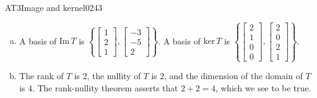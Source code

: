 \begin{exercise}{AT3}{Image and kernel}{0243}
\begin{exerciseAnswer}
\begin{enumerate}[(a)]
 
\item  

 A basis of \(\mathrm{Im}\,T\) is \(\left\{ \left[\begin{array}{c}
1 \\
2 \\
1
\end{array}\right] , \left[\begin{array}{c}
-3 \\
-5 \\
2
\end{array}\right] \right\}\). A basis of \(\mathrm{ker}\,T\) is \(\left\{ \left[\begin{array}{c}
2 \\
1 \\
0 \\
0
\end{array}\right] , \left[\begin{array}{c}
2 \\
0 \\
2 \\
1
\end{array}\right] \right\}\). 

 
\item  

 The rank of \(T\) is \(2\), the nullity of \(T\) is \(2\), and the dimension of the domain of \(T\) is \(4\). The rank-nullity theorem asserts that \(2+2=4\), which we see to be true. 

 
\end{enumerate}

     \end{exerciseAnswer}
 \end{exercise}



